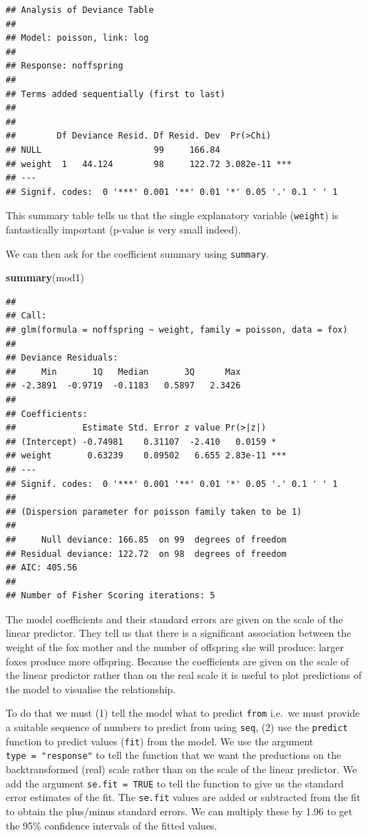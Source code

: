 \documentclass[
  a4paperpaper,
]{book}
\newenvironment{Shaded}{\begin{snugshade}}{\end{snugshade}}
\newcommand{\KeywordTok}[1]{\textcolor[rgb]{0.13,0.29,0.53}{\textbf{#1}}}
\newcommand{\NormalTok}[1]{#1}
\begin{document}
\begin{verbatim}
## Analysis of Deviance Table
## 
## Model: poisson, link: log
## 
## Response: noffspring
## 
## Terms added sequentially (first to last)
## 
## 
##        Df Deviance Resid. Df Resid. Dev  Pr(>Chi)    
## NULL                      99     166.84              
## weight  1   44.124        98     122.72 3.082e-11 ***
## ---
## Signif. codes:  0 '***' 0.001 '**' 0.01 '*' 0.05 '.' 0.1 ' ' 1
\end{verbatim}

This summary table tells us that the single explanatory variable (\texttt{weight}) is fantastically important (p-value is very small indeed).

We can then ask for the coefficient summary using \texttt{summary}.

\begin{Shaded}
\begin{Highlighting}[]
\KeywordTok{summary}\NormalTok{(mod1)}
\end{Highlighting}
\end{Shaded}

\begin{verbatim}
## 
## Call:
## glm(formula = noffspring ~ weight, family = poisson, data = fox)
## 
## Deviance Residuals: 
##     Min       1Q   Median       3Q      Max  
## -2.3891  -0.9719  -0.1183   0.5897   2.3426  
## 
## Coefficients:
##             Estimate Std. Error z value Pr(>|z|)    
## (Intercept) -0.74981    0.31107  -2.410   0.0159 *  
## weight       0.63239    0.09502   6.655 2.83e-11 ***
## ---
## Signif. codes:  0 '***' 0.001 '**' 0.01 '*' 0.05 '.' 0.1 ' ' 1
## 
## (Dispersion parameter for poisson family taken to be 1)
## 
##     Null deviance: 166.85  on 99  degrees of freedom
## Residual deviance: 122.72  on 98  degrees of freedom
## AIC: 405.56
## 
## Number of Fisher Scoring iterations: 5
\end{verbatim}

The model coefficients and their standard errors are given on the scale of the linear predictor. They tell us that there is a significant association between the weight of the fox mother and the number of offspring she will produce: larger foxes produce more offspring. Because the coefficients are given on the scale of the linear predictor rather than on the real scale it is useful to plot predictions of the model to visualise the relationship.

To do that we must (1) tell the model what to predict \texttt{from} i.e.~we must provide a suitable sequence of numbers to predict from using \texttt{seq}, (2) use the \texttt{predict} function to predict values (\texttt{fit}) from the model. We use the argument \texttt{type\ =\ "response"} to tell the function that we want the preductions on the backtransformed (real) scale rather than on the scale of the linear predictor. We add the argument \texttt{se.fit\ =\ TRUE} to tell the function to give us the standard error estimates of the fit. The \texttt{se.fit} values are added or subtracted from the fit to obtain the plus/minus standard errors. We can multiply these by 1.96 to get the 95\% confidence intervals of the fitted values.
\end{document}
